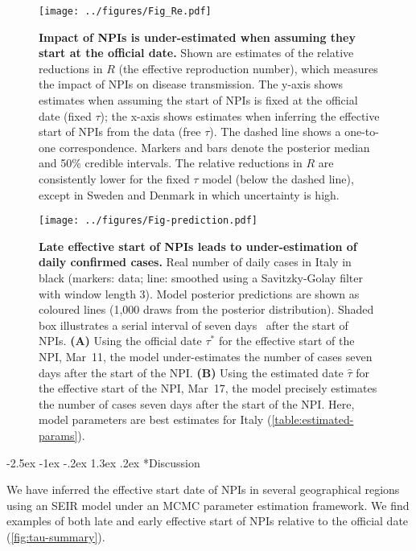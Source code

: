 \documentclass[12pt]{extarticle}
\makeatletter
\renewcommand\section{\@startsection {section}{1}{\z@}%
     {-2.5ex \@plus -1ex \@minus -.2ex}%
     {1.3ex \@plus.2ex}%
    {\Large\bfseries}}
\makeatother
\begin{document}
\begin{figure}[h]
    \centering
	\texttt{[image: ../figures/Fig\_Re.pdf]}
    \caption{
    \textbf{Impact of NPIs is under-estimated when assuming they start at the official date.}
    Shown are estimates of the relative reductions in $R$ (the effective reproduction number), which measures the impact of NPIs on disease transmission.
     The y-axis shows estimates when assuming the start of NPIs is fixed at the official date (fixed $\tau$); the x-axis shows estimates when inferring the effective start of NPIs from the data (free $\tau$). The dashed line shows a one-to-one correspondence.
     Markers and bars denote the posterior median and 50\% credible intervals.
    The relative reductions in $R$ are consistently lower for the fixed $\tau$ model (below the dashed line), except in Sweden and Denmark in which uncertainty is high.
    } 
    \label{fig:Re}
\end{figure}



\begin{figure}[h]
    \centering
    \texttt{[image: ../figures/Fig-prediction.pdf]}
    \caption{
    \textbf{Late effective start of NPIs leads to under-estimation of daily confirmed cases.}
    Real number of daily cases in Italy in black (markers: data; line: smoothed using a Savitzky-Golay filter with window length 3).
    Model posterior predictions are shown as coloured lines (1,000 draws from the posterior distribution).
    Shaded box illustrates a serial interval of seven days~\citep{Ali2020} after the start of NPIs.
    \textbf{(A)} Using the official date $\tau^*$ for the effective start of the NPI, Mar~11, the model under-estimates the number of cases seven days after the start of the NPI.
    \textbf{(B)} Using the estimated date $\hat{\tau}$ for the effective start of the NPI, Mar~17, the model precisely estimates the number of cases seven days after the start of the NPI.
    Here, model parameters are best estimates for Italy (\autoref{table:estimated-params}).
    }
    \label{fig:prediction}
\end{figure}


\pagebreak
\section*{Discussion}

We have inferred the effective start date of NPIs in several geographical regions using an SEIR model under an MCMC parameter estimation framework.
We find examples of both late and early effective start of NPIs relative to the official date (\autoref{fig:tau-summary}).
\end{document}
